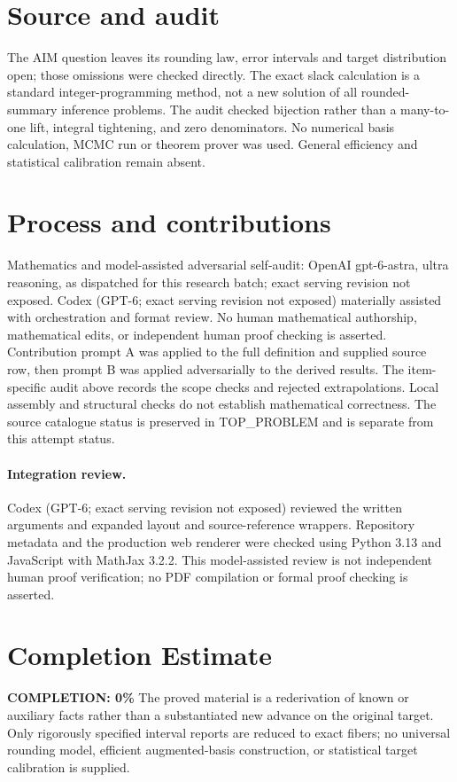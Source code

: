 \documentclass[11pt]{article}
\begin{document}
\section{Source and audit}
The AIM question leaves its rounding law, error intervals and target
distribution open; those omissions were checked directly. The exact
slack calculation is a standard integer-programming method, not a new
solution of all rounded-summary inference problems. The audit checked
bijection rather than a many-to-one lift, integral tightening, and zero
denominators. No numerical basis calculation, MCMC run or theorem prover
was used. General efficiency and statistical calibration remain absent.

\section{Process and contributions}
Mathematics and model-assisted adversarial self-audit: OpenAI gpt-6-astra, ultra reasoning, as dispatched for this research batch; exact serving revision not exposed. Codex (GPT-6; exact serving revision not exposed) materially assisted with orchestration and format review. No human mathematical authorship, mathematical edits, or independent human proof checking is asserted.
Contribution prompt A was applied to the full definition and supplied source row, then prompt B was applied adversarially to the derived results. The item-specific audit above records the scope checks and rejected extrapolations. Local assembly and structural checks do not establish mathematical correctness. The source catalogue status is preserved in TOP\_PROBLEM and is separate from this attempt status.
\paragraph{Integration review.} Codex (GPT-6; exact serving revision not exposed) reviewed the written arguments and expanded layout and source-reference wrappers. Repository metadata and the production web renderer were checked using Python 3.13 and JavaScript with MathJax 3.2.2. This model-assisted review is not independent human proof verification; no PDF compilation or formal proof checking is asserted.

\section{Completion Estimate}
\noindent\textbf{COMPLETION: 0\%}
The proved material is a rederivation of known or auxiliary facts rather than a substantiated new advance on the original target. Only rigorously specified interval reports are reduced to exact fibers; no universal rounding model, efficient augmented-basis construction, or statistical target calibration is supplied.
\end{document}
